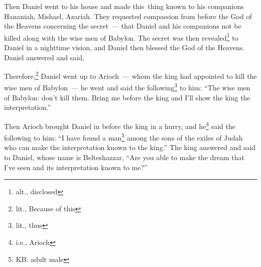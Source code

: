\begin{inparaenum}
     Then Daniel went to his house and made this\understood\ thing known to his companions Hananiah, Mishael, Azariah.%
     They requested compassion from before the God of the Heavens concerning the secret~--- that Daniel and his companions not be killed along with the wise men of Babylon.%
     The secret was then revealed\footnote{alt., disclosed} to Daniel in a nighttime vision, and Daniel then blessed the God of the Heavens.%
     Daniel answered and said,%
    
    
    
    
    
    
    
    
    
    
    \noindent{} Therefore,\footnote{lit., Because of this} Daniel went up to Arioch~--- whom the king had appointed to kill the wise men of Babylon~--- he went and said the following\footnote{lit., thus} to him: ``The wise men of Babylon: don't kill them. Bring me before the king and I'll show the king the interpretation.''%
    
     Then Arioch brought Daniel in before the king in a hurry, and he\footnote{i.e., Arioch} said the following to him: ``I have found a man\footnote{KB: adult male} among the sons of the exiles of Judah who can make the interpretation known to the king.''%
     The king answered and said to Daniel, whose name is Belteshazzar, ``Are you able to make the dream that I've seen and its interpretation known to me?''%
    

\end{inparaenum}
